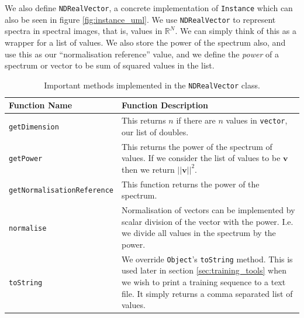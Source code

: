 \documentclass[12pt,twoside,notitlepage]{report}
\newcommand{\vc}[1]{\mathbf{#1}}
\newcommand{\bb}[1]{\mathbb{#1}}
\begin{document}
                We also define \texttt{NDRealVector}, a concrete implementation of \texttt{Instance} which can also 
                be seen in figure \ref{fig:instance_uml}. We use \texttt{NDRealVector} to represent spectra in spectral 
                images, that is, values in $\bb{R}^N$. We can simply think of this as 
                a wrapper for a list of values. We also store the power of the spectrum also, and use this as our 
                ``normalisation reference'' value, and we define the \textit{power} of a spectrum or vector to be sum 
                of squared values in the list.

                \begin{table}[H]
                    \begin{tabularx}{\textwidth}{l|X}
                        \textbf{Function Name} & \textbf{Function Description} \\
                        \hline

                        \texttt{getDimension} & 
                            This returns $n$ if there are $n$ values in \texttt{vector}, our list of doubles.  \\ 
                        \hline

                        \texttt{getPower} & 
                            This returns the power of the spectrum of values. If we consider the list of values 
                            to be $\vc{v}$ then we return $||\vc{v}||^2$. \\ 
                        \hline

                        \texttt{getNormalisationReference} & 
                            This function returns the power of the spectrum. \\
                        \hline

                        \texttt{normalise} & 
                            Normalisation of vectors can be implemented by scalar division of the vector with the power. 
                            I.e. we divide all values in the spectrum by the power. \\ 
                        \hline

                        \texttt{toString} & 
                            We override \texttt{Object}'s \texttt{toString} method. This is used later in section 
                            \ref{sec:training_tools} when we wish to print a training sequence to a text file. It 
                            simply returns a comma separated list of values. 

                    \end{tabularx}
                    \caption{Important methods implemented in the \texttt{NDRealVector} class.}
                    \label{tab:NDRealVector}
                \end{table}
\end{document}
